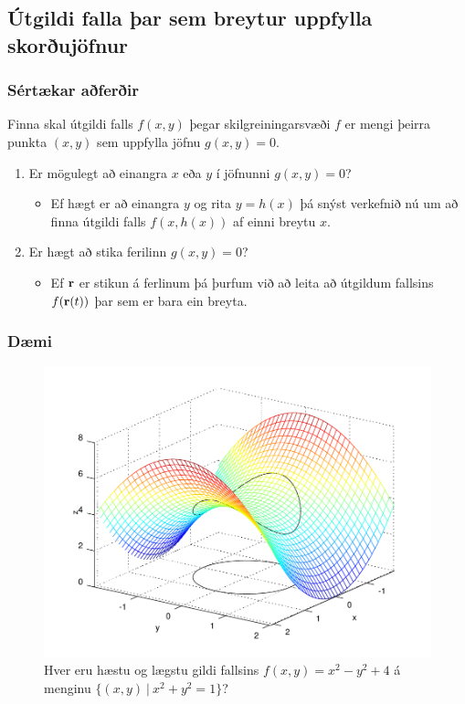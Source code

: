 \subsection{Útgildi falla þar sem breytur uppfylla skorðujöfnur} 

\subsubsection{Sértækar aðferðir  }
Finna skal útgildi falls $f(x,y)$ þegar skilgreiningarsvæði $f$ er mengi þeirra punkta $(x,y)$ sem uppfylla jöfnu $g(x,y)=0$.  


\begin {enumerate}
 \item Er mögulegt að einangra $x$ eða $y$ í jöfnunni $g(x,y)=0$?  
 
 \medskip
 \begin {itemize}
  \item [] Ef hægt er að einangra $y$ og rita $y=h(x)$ þá snýst verkefnið nú um að finna útgildi falls $f(x,h(x))$ af einni breytu $x$.

 \end {itemize}
 \item  Er hægt að stika ferilinn $g(x,y)=0$?  
 
 \begin {itemize}
  \item [] Ef $\mbox{${\bf r}$}$ er stikun á
     ferlinum þá þurfum við að leita að útgildum fallsins $f(\mbox{${\bf r}$}(t))$ þar sem
     er bara ein breyta.  
 \end {itemize}

\end {enumerate}


\subsubsection{Dæmi}
 \begin {figure}[h!]
 \centering
            \includegraphics[width=.7\linewidth]{constraint.png}
            \caption*{Hver eru hæstu og lægstu gildi fallsins $f(x,y) = x^2-y^2+4$ á menginu $\{(x,y)~|~x^2+y^2=1\}$?}
\end {figure}


